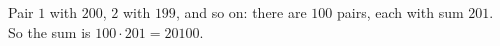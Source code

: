 Pair $1$ with $200$, $2$ with $199$, and so on: there are $100$ pairs, each with sum $201$. So the sum is $100\cdot201=\boxed{20100}$.
